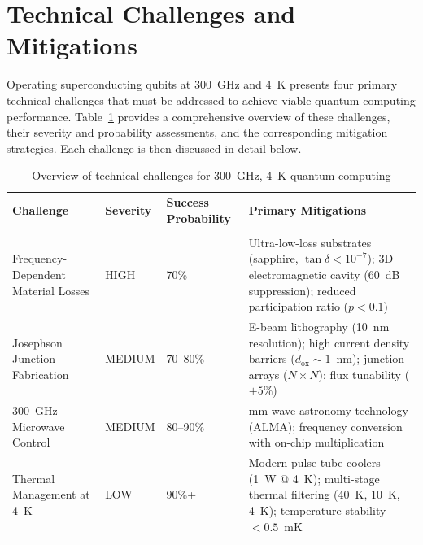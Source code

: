 \section{Technical Challenges and Mitigations}
\label{sec:challenges}

Operating superconducting qubits at 300~GHz and 4~K presents four primary technical challenges that must be addressed to achieve viable quantum computing performance. Table~\ref{tab:challenges_overview} provides a comprehensive overview of these challenges, their severity and probability assessments, and the corresponding mitigation strategies. Each challenge is then discussed in detail below.

\begin{table}[h]
\centering
\caption{Overview of technical challenges for 300~GHz, 4~K quantum computing}
\label{tab:challenges_overview}
\small
\begin{tabular}{@{}p{}p{}p{}p{}@{}}
\toprule
\textbf{Challenge} & \textbf{Severity} & \textbf{Success Probability} & \textbf{Primary Mitigations} \\ \\
\midrule
Frequency-Dependent Material Losses & HIGH & 70\% & Ultra-low-loss substrates (sapphire, $\tan\delta < 10^{-7}$); 3D electromagnetic cavity (60~dB suppression); reduced participation ratio ($p < 0.1$) \\
\midrule
Josephson Junction Fabrication & MEDIUM & 70--80\% & E-beam lithography (10~nm resolution); high current density barriers ($d_{\text{ox}} \sim 1$~nm); junction arrays ($N \times N$); flux tunability ($\pm 5\%$) \\
\midrule
300~GHz Microwave Control & MEDIUM & 80--90\% & mm-wave astronomy technology (ALMA); frequency conversion with on-chip multiplication \\
\midrule
Thermal Management at 4~K & LOW & 90\%+ & Modern pulse-tube coolers (1~W @ 4~K); multi-stage thermal filtering (40~K, 10~K, 4~K); temperature stability $< 0.5$~mK \\
\bottomrule
\end{tabular}
\end{table}

